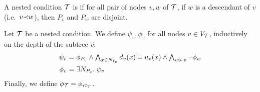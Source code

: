 \begin{definition}
	A nested condition ${\mathcal{T}}$ is \emph{\proper} if for all pair of nodes $v, w$ of ${\mathcal{T}}$, if $w$ is a descendant of $v$ (i.e.\ $v {\prec} w$), then $P_v$ and $P_w$ 
	are disjoint. 
\end{definition}
%
%
Let ${\mathcal{T}}$ be a \proper nested condition. We define $\psi_v,\phi_v$ for all nodes $v\in V_{\mathcal{T}}$, inductively on the depth of the subtree $\hat v$:
%
\begin{align}
\psi_v = {} & \textstyle \phi_{P_v}\wedge \bigwedge_{x\in N_{I_v}} d_v(x)\Eq u_v(x) \wedge \bigwedge_{w\childof v} \neg\phi_w \label{eq:psi} \\
\phi_v = {} & \exists N_{P_v}\st \psi_v\label{eq:phi} 
\end{align}
%
Finally, we define $\phi_{\mathcal{T}}=\phi_{\mathit{rt}_{{\mathcal{T}}}}$.
%


